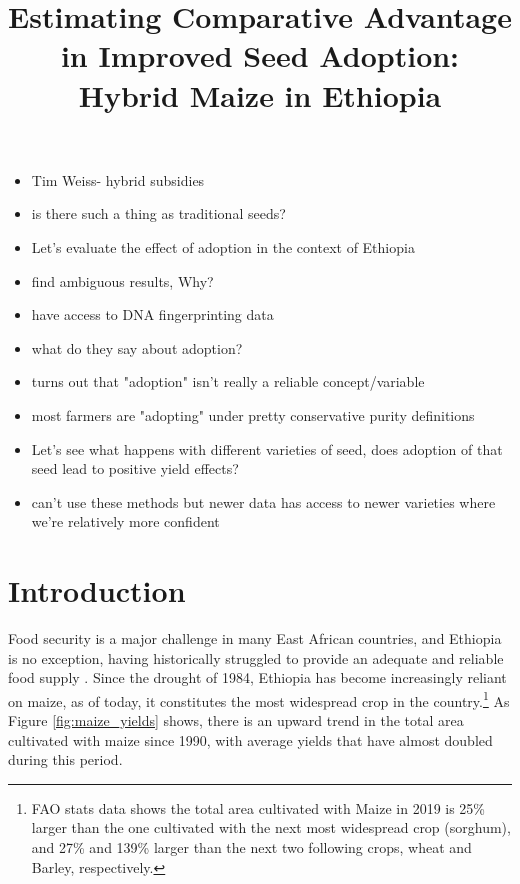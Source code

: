 \documentclass{article}
\title{Estimating Comparative Advantage in Improved Seed Adoption: Hybrid Maize in Ethiopia}
\begin{document}
\maketitle



\begin{itemize}
    \item Tim Weiss- hybrid subsidies
    \item is there such a thing as traditional seeds?
    
    \item Let's evaluate the effect of adoption in the context of Ethiopia
    \item find ambiguous results, Why?
    \item have access to DNA fingerprinting data
    \item what do they say about adoption?
    \item turns out that "adoption" isn't really a reliable concept/variable
    \item most farmers are "adopting" under pretty conservative purity definitions
    \item Let's see what happens with different varieties of seed, does adoption of that seed lead to positive yield effects?
    \item can't use these methods but newer data has access to newer varieties where we're relatively more confident
\end{itemize}

\section{Introduction}

Food security is a major challenge in many East African countries, and Ethiopia is no exception, having historically struggled to provide an adequate and reliable food supply \citep{Ramakrishna2002-hv, Jaleta2018-oj}. Since the drought of 1984, Ethiopia has become increasingly reliant on maize, as of today, it constitutes the most widespread crop in the country.\footnote{FAO stats data shows the total area cultivated with Maize in 2019 is 25\% larger than the one cultivated with the next most widespread crop (sorghum), and 27\% and 139\% larger than the next two following crops, wheat and Barley, respectively.} As Figure \ref{fig:maize_yields} shows, there is an upward trend in the total area cultivated with maize since 1990, with average yields that have almost doubled during this period.
\end{document}
